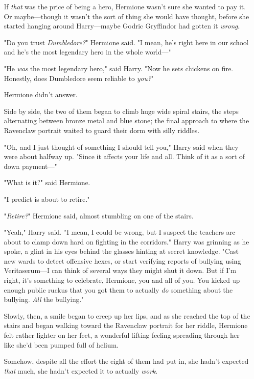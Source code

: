 If \emph{that} was the price of being a hero, Hermione wasn't sure she wanted
to pay it. Or maybe---though it wasn't the sort of thing she would have
thought, before she started hanging around Harry---maybe Godric Gryffindor had
gotten it \emph{wrong}.

"Do you trust \emph{Dumbledore?}" Hermione said. "I mean, he's right here in
our school and he's the most legendary hero in the whole world---"

"He \emph{was} the most legendary hero," said Harry. "Now he sets chickens on
fire. Honestly, does Dumbledore seem reliable to \emph{you?}"

Hermione didn't answer.

Side by side, the two of them began to climb huge wide spiral stairs, the steps
alternating between bronze metal and blue stone; the final approach to where
the Ravenclaw portrait waited to guard their dorm with silly riddles.

"Oh, and I just thought of something I should tell you," Harry said when they
were about halfway up. "Since it affects your life and all. Think of it as a
sort of down payment---"

"What is it?" said Hermione.

"I predict \SPHEW is about to retire."

"\emph{Retire?}" Hermione said, almost stumbling on one of the stairs.

"Yeah," Harry said. "I mean, I could be wrong, but I suspect the teachers are
about to clamp down hard on fighting in the corridors." Harry was grinning as
he spoke, a glint in his eyes behind the glasses hinting at secret knowledge.
"Cast new wards to detect offensive hexes, or start verifying reports of
bullying using Veritaserum---I can think of several ways they might shut it
down. But if I'm right, it's something to celebrate, Hermione, you and all of
you. You kicked up enough public ruckus that you got them to actually \emph{do}
something about the bullying. \emph{All} the bullying."

Slowly, then, a smile began to creep up her lips, and as she reached the top of
the stairs and began walking toward the Ravenclaw portrait for her riddle,
Hermione felt rather lighter on her feet, a wonderful lifting feeling spreading
through her like she'd been pumped full of helium.

Somehow, despite all the effort the eight of them had put in, she hadn't
expected \emph{that} much, she hadn't expected it to actually \emph{work}.

